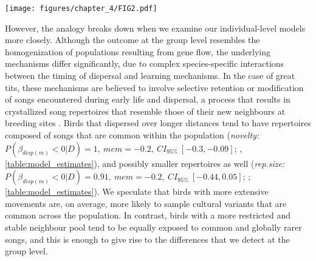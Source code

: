 \begin{figure*}[ht!]
    \centering
    \texttt{[image: figures/chapter\_4/FIG2.pdf]}
    \label{c4_fig:individual}
\end{figure*}

However, the analogy breaks down when we examine our individual-level models more closely. Although the outcome at the group level resembles the homogenization of populations resulting from gene flow, the underlying mechanisms differ significantly, due to complex species-specific interactions between the timing of dispersal and learning mechanisms. In the case of great tits, these mechanisms are believed to involve selective retention or modification of songs encountered during early life and dispersal, a process that results in crystallized song repertoires that resemble those of their new neighbours at breeding sites \parencite{marler1982, peters2017, nelson1992}. Birds that dispersed over longer distances tend to have repertoires composed of songs that are common within the population (\textit{novelty:} $P(\beta_{disp (m)} < 0 | D) = 1,~mem = -0.2,~CI_{95\%}~[-0.3, -0.09]$; , \autoref{table:model_estimates}), and possibly smaller repertoires as well (\textit{rep.size:} $P(\beta_{disp (m)} < 0 | D) = 0.91,~mem = -0.2,~CI_{95\%}~[-0.44, 0.05]$; ; \autoref{table:model_estimates}). We speculate that birds with more extensive movements are, on average, more likely to sample cultural variants that are common across the population. In contrast, birds with a more restricted and stable neighbour pool tend to be equally exposed to common and globally rarer songs, and this is enough to give rise to the differences that we detect at the group level.

